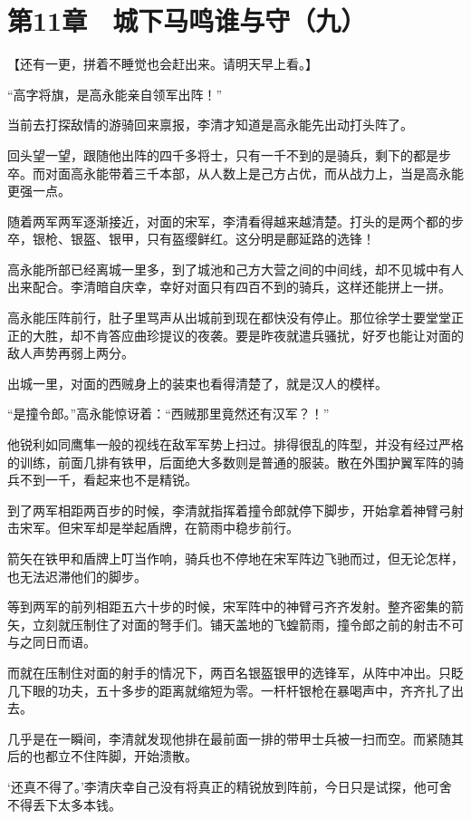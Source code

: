 \section{第11章　城下马鸣谁与守（九）}

【还有一更，拼着不睡觉也会赶出来。请明天早上看。】

“高字将旗，是高永能亲自领军出阵！”

当前去打探敌情的游骑回来禀报，李清才知道是高永能先出动打头阵了。

回头望一望，跟随他出阵的四千多将士，只有一千不到的是骑兵，剩下的都是步卒。而对面高永能带着三千本部，从人数上是己方占优，而从战力上，当是高永能更强一点。

随着两军两军逐渐接近，对面的宋军，李清看得越来越清楚。打头的是两个都的步卒，银枪、银盔、银甲，只有盔缨鲜红。这分明是鄜延路的选锋！

高永能所部已经离城一里多，到了城池和己方大营之间的中间线，却不见城中有人出来配合。李清暗自庆幸，幸好对面只有四百不到的骑兵，这样还能拼上一拼。

高永能压阵前行，肚子里骂声从出城前到现在都快没有停止。那位徐学士要堂堂正正的大胜，却不肯答应曲珍提议的夜袭。要是昨夜就遣兵骚扰，好歹也能让对面的敌人声势再弱上两分。

出城一里，对面的西贼身上的装束也看得清楚了，就是汉人的模样。

“是撞令郎。”高永能惊讶着：“西贼那里竟然还有汉军？！”

他锐利如同鹰隼一般的视线在敌军军势上扫过。排得很乱的阵型，并没有经过严格的训练，前面几排有铁甲，后面绝大多数则是普通的服装。散在外围护翼军阵的骑兵不到一千，看起来也不是精锐。

到了两军相距两百步的时候，李清就指挥着撞令郎就停下脚步，开始拿着神臂弓射击宋军。但宋军却是举起盾牌，在箭雨中稳步前行。

箭矢在铁甲和盾牌上叮当作响，骑兵也不停地在宋军阵边飞驰而过，但无论怎样，也无法迟滞他们的脚步。

等到两军的前列相距五六十步的时候，宋军阵中的神臂弓齐齐发射。整齐密集的箭矢，立刻就压制住了对面的弩手们。铺天盖地的飞蝗箭雨，撞令郎之前的射击不可与之同日而语。

而就在压制住对面的射手的情况下，两百名银盔银甲的选锋军，从阵中冲出。只眨几下眼的功夫，五十多步的距离就缩短为零。一杆杆银枪在暴喝声中，齐齐扎了出去。

几乎是在一瞬间，李清就发现他排在最前面一排的带甲士兵被一扫而空。而紧随其后的也都立不住阵脚，开始溃散。

‘还真不得了。’李清庆幸自己没有将真正的精锐放到阵前，今日只是试探，他可舍不得丢下太多本钱。

